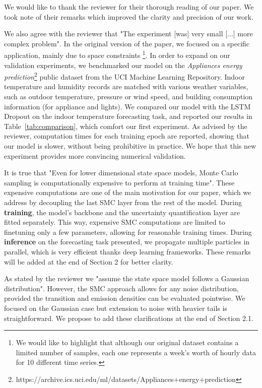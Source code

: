 \documentclass{article}
\begin{document}
We would like to thank the reviewer for their thorough reading of our paper.
We took note of their remarks which improved the clarity and precision of our work.

We also agree with the reviewer that "The experiment [was] very small [...] more complex problem".
In the original version of the paper, we focused on a specific application, mainly due to space constraints \footnote{We would like to highlight that although our original dataset contains a limited number of samples, each one represents a week's worth of hourly data for 10 different time series.}.
In order to expand on our validation experiments, we benchmarked our model on the \textit{Appliances energy prediction}\footnote{https://archive.ics.uci.edu/ml/datasets/Appliances+energy+prediction} public dataset from the UCI Machine Learning Repository.
Indoor temperature and humidity records are matched with various weather variables, such as outdoor temperature, pressure or wind speed, and building consumption information (for appliance and lights).
We compared our model with the LSTM Dropout on the indoor temperature forecasting task, and reported our results in Table~\ref{tab:comparison}, which comfort our first experiment.
As advised by the reviewer, computation times for each training epoch are reported, showing that our model is slower, without being prohibitive in practice.
We hope that this new experiment provides more convincing numerical validation.

It is true that "Even for lower dimensional state space models, Monte Carlo sampling is computationally expensive to perform at training time".
These expensive computations are one of the main motivation for our paper, which we address by decoupling the last SMC layer from the rest of the model.
During \textbf{training}, the model's backbone and the uncertainty quantification layer are fitted separately.
This way, expensive SMC computations are limited to finetuning only a few parameters, allowing for reasonable training times.
During {\bf inference} on the forecasting task presented, we propagate multiple particles in parallel, which is very efficient thanks deep learning frameworks.
These remarks will be added at the end of Section 2 for better clarity.

As stated by the reviewer we "assume the state space model follows a Gaussian distribution".
However, the SMC approach allows for any noise distribution, provided the transition and emission densities can be evaluated pointwise.
We focused on the Gaussian case but extension to noise with heavier tails is straightforward.
We propose to add these clarifications at the end of Section 2.1.
\end{document}
